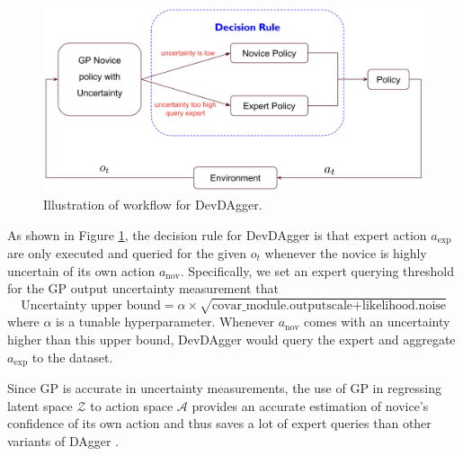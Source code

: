 \documentclass[11pt, reqno, letterpaper, twoside]{amsart}
\begin{document}
\begin{figure}[htbp!]
	\centering
	\includegraphics[width=\linewidth]{imgs/dev_dagger_diagram.png}
	\caption{Illustration of workflow for DevDAgger.}
	\label{fig:devdagger_diagram}
\end{figure}

As shown in Figure \ref{fig:devdagger_diagram}, the decision rule for DevDAgger
is that expert action $a_\text{exp}$ are only executed and queried for the given
$o_t$ whenever the novice is highly uncertain of its own action $a_\text{nov}$.
Specifically, we set an expert querying threshold for the GP output uncertainty
measurement that
\begin{equation}
	\text{Uncertainty upper bound}=\alpha \times \sqrt{\text{covar\_module.outputscale}+\text{likelihood.noise}}
\end{equation}
where $\alpha$ is a tunable hyperparameter. Whenever $a_\text{nov}$ comes with
an uncertainty higher than this upper bound, DevDAgger would query the expert
and aggregate $a_\text{exp}$ to the dataset.

Since GP is accurate in uncertainty measurements, the use of GP in regressing
latent space $\mathcal{Z}$ to action space $\mathcal{A}$ provides an accurate
estimation of novice's confidence of its own action and thus saves a lot of
expert queries than other variants of DAgger \cite{ensemble-dagger}.
\end{document}
